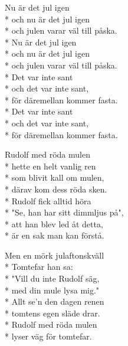 \begin{SongText}
    \begin{SongVerse}
        Nu är det jul igen\\*%
        och nu är det jul igen\\*%
        och julen varar väl till påska.\\*%
        Nu är det jul igen\\*%
        och nu är det jul igen\\*%
        och julen varar väl till påska.\\*%
        Det var inte sant\\*%
        och det var inte sant,\\*%
        för däremellan kommer fasta.\\*%
        Det var inte sant\\*%
        och det var inte sant,\\*%
        för däremellan kommer fasta.
    \end{SongVerse}
\end{SongText}
\begin{SongText}
    \begin{SongVerse}
        Rudolf med röda mulen\\*%
        hette en helt vanlig ren\\*%
        som blivit kall om mulen,\\*%
        därav kom dess röda sken.\\*%
        Rudolf fick alltid höra\\*%
        "Se, han har sitt dimmljus på",\\*%
        att han blev led åt detta,\\*%
        är en sak man kan förstå.
    \end{SongVerse}
    \begin{SongVerse}
        Men en mörk julaftonskväll\\*%
        Tomtefar han sa:\\*%
        "Vill du inte Rudolf säg,\\*%
        med din mule lysa mig."\\*%
        Allt se'n den dagen renen\\*%
        tomtens egen släde drar.\\*%
        Rudolf med röda mulen\\*%
        lyser väg för tomtefar.
    \end{SongVerse}
\end{SongText}
